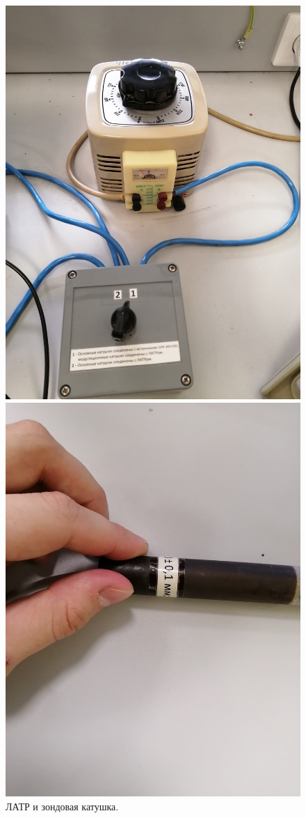 \documentclass[12pt,a4paper]{article}
\begin{document}
	\begin{figure}[H]
		\centering
		\begin{minipage}{0.4\textwidth}
			\centering
			\includegraphics[width=0.7\linewidth]{photos/latr.jpg}
		\end{minipage}%
		\begin{minipage}{0.3\textwidth}
			\centering
			\includegraphics[width=0.7\linewidth]{photos/probe.jpg}
		\end{minipage}
		\caption{ЛАТР и зондовая катушка.}
		\label{fig:calibration_setup}
	\end{figure}
	
\end{document}
